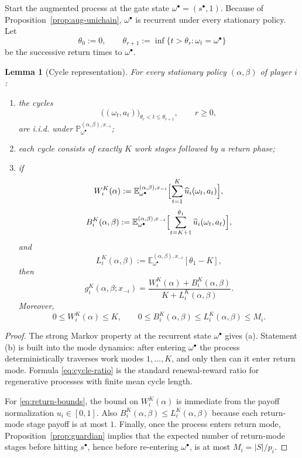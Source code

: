 \documentclass[11pt]{article}
\newtheorem{lemma}[theorem]{Lemma}
\theoremstyle{definition}
\newcommand{\E}{\mathbb{E}}
\newcommand{\Prob}{\mathbb{P}}
\newcommand{\1}{\mathbf{1}}
\begin{document}
Start the augmented process at the gate state $\omega^\bullet=(s^\bullet,1)$. Because of Proposition~\ref{prop:aug-unichain}, $\omega^\bullet$ is recurrent under every stationary policy. Let
\[
\theta_0:=0,
\qquad
\theta_{r+1}:=\inf\{t>\theta_r:\omega_t=\omega^\bullet\}
\]
be the successive return times to $\omega^\bullet$.

\begin{lemma}[Cycle representation]\label{lem:cycle}
For every stationary policy $(\alpha,\beta)$ of player $i$:
\begin{enumerate}[label=\textup{(\alph*)},leftmargin=2.5em]
\item the cycles
\[
\bigl((\omega_t,a_t)\bigr)_{\theta_r<t\le \theta_{r+1}},\qquad r\ge0,
\]
are i.i.d. under $\Prob_{\omega^\bullet}^{(\alpha,\beta),x_{-i}}$;
\item each cycle consists of exactly $K$ work stages followed by a return phase;
\item if
\[
W_i^K(\alpha):=\E_{\omega^\bullet}^{(\alpha,\beta),x_{-i}}
\Bigl[\sum_{t=1}^{K}\widehat u_i(\omega_t,a_t)\Bigr],
\]
\[
B_i^K(\alpha,\beta):=
\E_{\omega^\bullet}^{(\alpha,\beta),x_{-i}}
\Bigl[\sum_{t=K+1}^{\theta_1}\widehat u_i(\omega_t,a_t)\Bigr],
\]
and
\[
L_i^K(\alpha,\beta):=
\E_{\omega^\bullet}^{(\alpha,\beta),x_{-i}}[\theta_1-K],
\]
then
\begin{equation}\label{eq:cycle-ratio}
g_i^K(\alpha,\beta;x_{-i})
=
\frac{W_i^K(\alpha)+B_i^K(\alpha,\beta)}{K+L_i^K(\alpha,\beta)}.
\end{equation}
Moreover,
\begin{equation}\label{eq:return-bounds}
0\le W_i^K(\alpha)\le K,
\qquad
0\le B_i^K(\alpha,\beta)\le L_i^K(\alpha,\beta)\le M_i.
\end{equation}
\end{enumerate}
\end{lemma}

\begin{proof}
The strong Markov property at the recurrent state $\omega^\bullet$ gives \textup{(a)}. Statement \textup{(b)} is built into the mode dynamics: after entering $\omega^\bullet$ the process deterministically traverses work modes $1,\dots,K$, and only then can it enter return mode. Formula \eqref{eq:cycle-ratio} is the standard renewal-reward ratio for regenerative processes with finite mean cycle length.

For \eqref{eq:return-bounds}, the bound on $W_i^K(\alpha)$ is immediate from the payoff normalization $u_i\in[0,1]$. Also $B_i^K(\alpha,\beta)\le L_i^K(\alpha,\beta)$ because each return-mode stage payoff is at most $1$. Finally, once the process enters return mode, Proposition~\ref{prop:guardian} implies that the expected number of return-mode stages before hitting $s^\bullet$, hence before re-entering $\omega^\bullet$, is at most $M_i=|S|/p_i$.
\end{proof}
\end{document}
